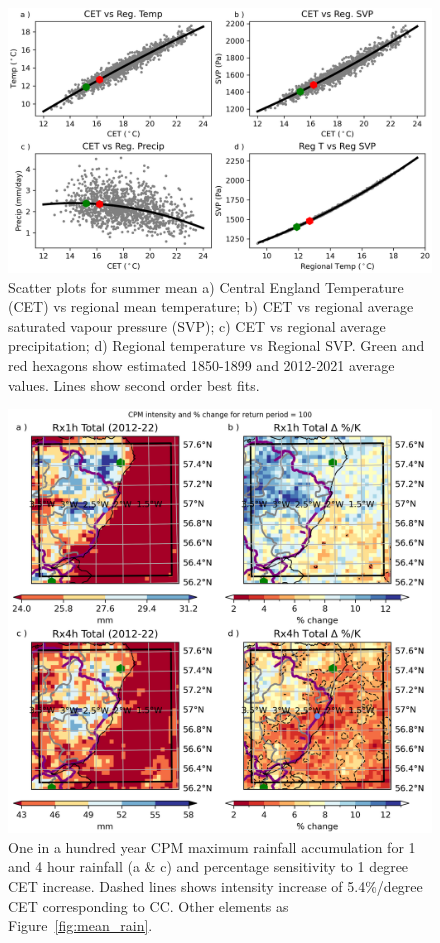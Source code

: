 \documentclass[11pt,a4paper]{article}
\begin{document}
\begin{figure}[tp]
	\centering
	\includegraphics[width=\linewidth]{scatter.png}
	\caption{Scatter plots for summer mean  a)  Central England Temperature (CET) vs  regional mean temperature; b) CET vs regional average saturated vapour pressure (SVP); c) CET vs regional average precipitation; d) Regional temperature vs Regional SVP. Green and red hexagons show estimated 1850-1899 and 2012-2021 average values. Lines show second order best fits.}
	\label{fig:cet_scatter}
\end{figure}

\begin{figure}
	\centering
	\includegraphics[width=1\linewidth]{cpm_intensity_delta}
	\caption{One in a hundred year CPM maximum rainfall accumulation for 1 and 4 hour rainfall (a \& c) and percentage sensitivity to 1 degree CET increase. Dashed lines shows intensity increase of 5.4\%/degree CET corresponding to CC. Other elements as Figure~\ref{fig:mean_rain}.  }
	\label{fig:map_intensity}
\end{figure}
\end{document}
